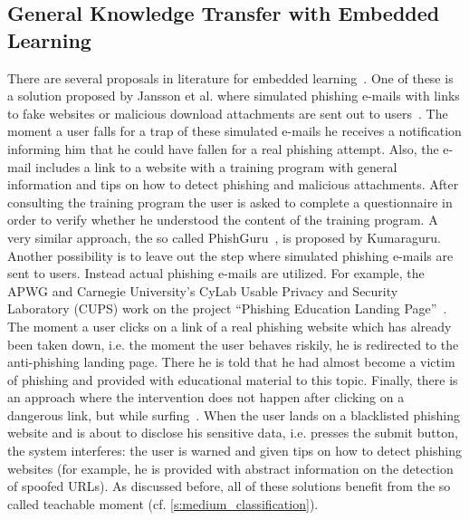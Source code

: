 \subsection{General Knowledge Transfer with Embedded Learning}

There are several proposals in literature for embedded learning~\cite{embedded2011jansson, kumaraguru2009phishguru,alnajim2009antiphishing}. 
One of these is a solution proposed by Jansson et al. where simulated phishing e-mails with links to fake websites or malicious download attachments are sent out to users~\cite{embedded2011jansson}. 
The moment a user falls for a trap of these simulated e-mails he receives a notification informing him that he could have fallen for a real phishing attempt. 
Also, the e-mail includes a link to a website with a training program with general information and tips on how to detect phishing and malicious attachments. 
After consulting the training program the user is asked to complete a questionnaire in order to verify whether he understood the content of the training program. 
A very similar approach, the so called PhishGuru~\cite{kumaraguru2009phishguru}, is proposed by Kumaraguru. 
Another possibility is to leave out the step where simulated phishing e-mails are sent to users. 
Instead actual phishing e-mails are utilized. 
For example, the APWG and Carnegie University's CyLab Usable Privacy and Security Laboratory (CUPS) work on the project ``Phishing Education Landing Page''~\cite{apwg2009landingpage}. 
The moment a user clicks on a link of a real phishing website which has already been taken down, i.e. the moment the user behaves riskily, he is redirected to the anti-phishing landing page.
There he is told that he had almost become a victim of phishing and provided with educational material to this topic. 
Finally, there is an approach where the intervention does not happen after clicking on a dangerous link, but while surfing~\cite{alnajim2009antiphishing}. 
When the user lands on a blacklisted phishing website and is about to disclose his sensitive data, i.e. presses the submit button, the system interferes: 
the user is warned and given tips on how to detect phishing websites (for example, he is provided with abstract information on the detection of spoofed URLs). 
As discussed before, all of these solutions benefit from the so called teachable moment (cf. \autoref{s:medium_classification}).
